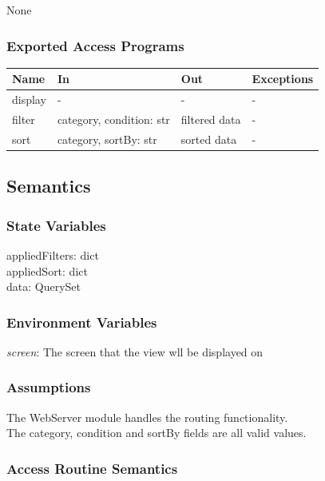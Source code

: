 \documentclass[12pt, titlepage]{article}
\begin{document}
None

\subsubsection{Exported Access Programs}

\begin{center}
\begin{tabular}{p{2cm} p{4cm} p{4cm} p{2cm}}
\hline
\textbf{Name} & \textbf{In} & \textbf{Out} & \textbf{Exceptions} \\
\hline
display & - & - & - \\
filter & category, condition: str & filtered data & - \\
sort & category, sortBy: str & sorted data & - \\
\hline
\end{tabular}
\end{center}

\subsection{Semantics}

\subsubsection{State Variables}

appliedFilters: dict \\
appliedSort: dict \\
data: QuerySet

\subsubsection{Environment Variables}

\textit{screen}: The screen that the view wll be displayed on

\subsubsection{Assumptions}

The WebServer module handles the routing functionality. \\
The category, condition and sortBy fields are all valid values.

\subsubsection{Access Routine Semantics}
\end{document}
